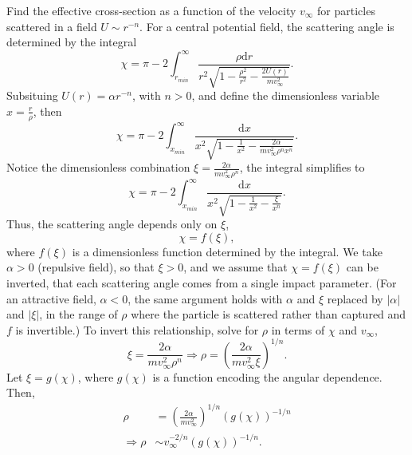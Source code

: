 \begin{problem}[title={Power-law fields: cross-section vs. velocity}]
{
Find the effective cross-section as a function of the velocity $v_\infty$ for particles scattered in a field $U \sim r^{-n}$.
}
{
For a central potential field, the scattering angle is determined by the integral
\begin{equation*}
    \chi = \pi - 2\int_{r_{min}}^\infty \frac{\rho \mathrm{d}r}{r^2 \sqrt{1 - \frac{\rho^2}{r^2} - \frac{2U(r)}{mv_\infty^2}}}.
\end{equation*}
Subsituing $U(r) = \alpha r^{-n}$, with $n>0$, and define the dimensionless variable $x = \frac{r}{\rho}$, then
\begin{equation*}
    \chi = \pi - 2\int_{x_{min}}^\infty \frac{\mathrm{d}x}{x^2 \sqrt{1 - \frac{1}{x^2} - \frac{2\alpha}{mv_\infty^2\rho^nx^n}}}.
\end{equation*}
Notice the dimensionless combination $\xi = \frac{2\alpha}{mv_\infty^2\rho^n}$, the integral simplifies to
\begin{equation*}
    \chi = \pi - 2\int_{x_{min}}^\infty \frac{\mathrm{d}x}{x^2 \sqrt{1 - \frac{1}{x^2} - \frac{\xi}{x^n}}}.
\end{equation*}
Thus, the scattering angle depends only on $\xi$,
\begin{equation*}
    \chi = f(\xi),
\end{equation*}
where $f(\xi)$ is a dimensionless function determined by the integral. We take $\alpha>0$ (repulsive field), so that $\xi>0$, and we assume that $\chi = f(\xi)$ can be inverted, \ie that each scattering angle comes from a single impact parameter. (For an attractive field, $\alpha<0$, the same argument holds with $\alpha$ and $\xi$ replaced by $|\alpha|$ and $|\xi|$, in the range of $\rho$ where the particle is scattered rather than captured and $f$ is invertible.) To invert this relationship, solve for $\rho$ in terms of $\chi$ and $v_\infty$,
\begin{equation*}
    \xi = \frac{2\alpha}{mv_\infty^2\rho^n} \Rightarrow \rho = \left( \frac{2\alpha}{mv_\infty^2\xi} \right)^{1/n}.
\end{equation*}
Let $\xi = g(\chi)$, where $g(\chi)$ is a function encoding the angular dependence. Then,
\begin{align*}
    \rho &= \left( \frac{2\alpha}{mv_\infty^2} \right)^{1/n} \left( g(\chi) \right)^{-1/n} \\
    \Rightarrow \rho &\sim v_\infty^{-2/n}\left( g(\chi) \right)^{-1/n}.
\end{align*}
}
\end{problem}
